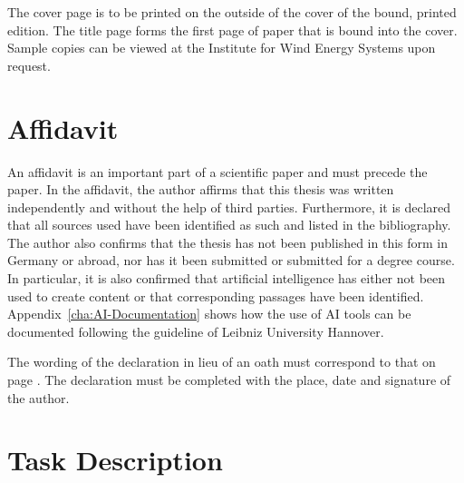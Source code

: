 The cover page is to be printed on the outside of the cover of the bound, printed edition. The title page forms the first page of paper that is bound into the cover. Sample copies can be viewed at the Institute for Wind Energy Systems upon request.


%

\section{Affidavit}
\label{sec:Affidavit}

An affidavit is an important part of a scientific paper and must precede the paper. In the affidavit, the author affirms that this thesis was written independently and without the help of third parties. Furthermore, it is declared that all sources used have been identified as such and listed in the bibliography. The author also confirms that the thesis has not been published in this form in Germany or abroad, nor has it been submitted or submitted for a degree course. In particular, it is also confirmed that artificial intelligence has either not been used to create content or that corresponding passages have been identified. Appendix~\ref{cha:AI-Documentation} shows how the use of AI tools can be documented following the guideline of Leibniz University Hannover.

The wording of the declaration in lieu of an oath must correspond to that on page \pageref{Affidavit}. The declaration must be completed with the place, date and signature of the author.


\section{Task Description}
\label{sec:Task}

